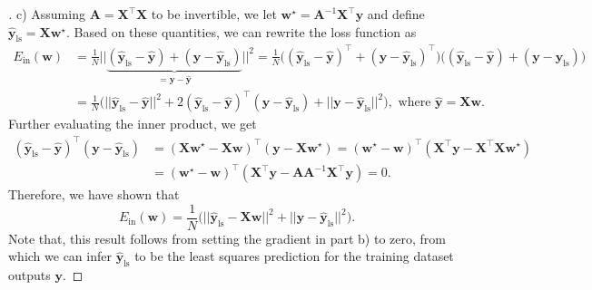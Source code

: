 \documentclass{article}
\renewcommand{\vec}[1]{\mathbf{#1}}
\begin{document}
    \begin{proof}[\unskip\nopunct]
        c) Assuming $\vec{A} = \vec{X}^\top\vec{X}$ to be invertible, we let 
        $\vec{w}^\star=\vec{A}^{-1}\vec{X}^\top\vec{y}$ and 
        define $\hat{\vec{y}}_{\text{ls}}=\vec{X}\vec{w}^\star$. 
        Based on these quantities, we can rewrite the loss function as
        \begin{align*}
            E_{\text{in}}(\vec{w}) &= \frac{1}{N}||\underbrace{(\hat{\vec{y}}_
            {\text{ls}}-\hat{\vec{y}})+(\vec{y}-\hat{\vec{y}}_{\text{ls}})}_
            {=\vec{y}-\hat{\vec{y}}}||^2 = \frac{1}{N}\big((\hat{\vec{y}}_
            {\text{ls}}-\hat{\vec{y}})^\top+(\vec{y}-\hat{\vec{y}}_
            {\text{ls}})^\top\big)\big((\hat{\vec{y}}_{\text{ls}}-\hat{
            \vec{y}})+(\vec{y}-\hat{\vec{y}}_{\text{ls}})\big)\\
            &= \frac{1}{N}\big(||\hat{\vec{y}}_{\text{ls}}-\hat{\vec{y}}||^2
            +2(\hat{\vec{y}}_{\text{ls}}-\hat{\vec{y}})^\top(\vec{y}-\hat{
            \vec{y}}_{\text{ls}})+||\vec{y}-\hat{\vec{y}}_
            {\text{ls}}||^2\big), \text{ where }\hat{\vec{y}}=\vec{X}\vec{w}.
        \end{align*}
        Further evaluating the inner product, we get
        \begin{align*}
            (\hat{\vec{y}}_{\text{ls}}-\hat{\vec{y}})^\top(\vec{y}-\hat{
            \vec{y}}_{\text{ls}}) &= (\vec{X}\vec{w}^\star-\vec{X}\vec{w})^
            \top(\vec{y}-\vec{X}\vec{w}^\star)=(\vec{w}^\star-\vec{w})^\top(
            \vec{X}^\top\vec{y}-\vec{X}^\top\vec{X}\vec{w}^\star)\\
            &= (\vec{w}^\star-\vec{w})^\top(\vec{X}^\top\vec{y}-\vec{A}\vec{A}
            ^{-1}\vec{X}^\top\vec{y}) = 0.
        \end{align*}
        Therefore, we have shown that 
        \begin{equation}
            \label{eqn:loss_least_squares}
            E_{\text{in}}(\vec{w}) = \frac{1}{N}\big(||\hat{\vec{y}}_{
            \text{ls}}-\vec{X}\vec{w}||^2+||\vec{y}-\hat{\vec{y}}_{\text{ls}}
            ||^2\big).
        \end{equation}
        Note that, this result follows from setting the gradient in part b) 
        to zero, from which we can infer $\hat{\vec{y}}_{\text{ls}}$ to be 
        the least squares prediction for the training dataset outputs 
        $\vec{y}$.
    \end{proof}
\end{document}
